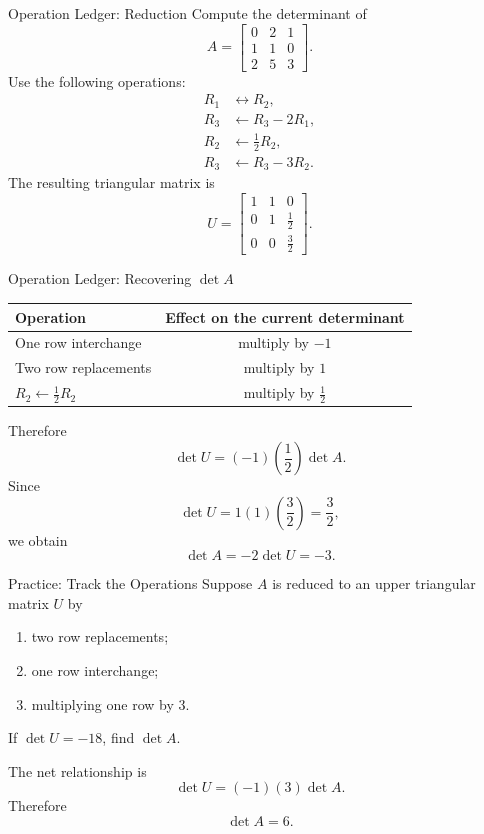 \begin{frame}{Operation Ledger: Reduction}
\small
Compute the determinant of
\[
A=\begin{bmatrix}
0&2&1\\
1&1&0\\
2&5&3
\end{bmatrix}.
\]
Use the following operations:
\[
\begin{aligned}
R_1&\leftrightarrow R_2,\\
R_3&\leftarrow R_3-2R_1,\\
R_2&\leftarrow \tfrac12 R_2,\\
R_3&\leftarrow R_3-3R_2.
\end{aligned}
\]
\pause
The resulting triangular matrix is
\[
U=\begin{bmatrix}
1&1&0\\
0&1&\tfrac12\\
0&0&\tfrac32
\end{bmatrix}.
\]
\end{frame}

\begin{frame}{Operation Ledger: Recovering $\det A$}
\small
\renewcommand{\arraystretch}{1.35}
\begin{center}
\begin{tabular}{lc}
\toprule
Operation & Effect on the current determinant \\
\midrule
One row interchange & multiply by $-1$ \\
Two row replacements & multiply by $1$ \\
$R_2\leftarrow\tfrac12R_2$ & multiply by $\tfrac12$ \\
\bottomrule
\end{tabular}
\end{center}
Therefore
\[
\det U=(-1)\left(\frac12\right)\det A.
\]
\pause
Since
\[
\det U=1(1)\left(\frac32\right)=\frac32,
\]
we obtain
\[
\boxed{\det A=-2\det U=-3}.
\]
\end{frame}

\begin{frame}{Practice: Track the Operations}
Suppose $A$ is reduced to an upper triangular matrix $U$ by
\begin{enumerate}
  \item two row replacements;
  \item one row interchange;
  \item multiplying one row by $3$.
\end{enumerate}
If $\det U=-18$, find $\det A$.
\pause

The net relationship is
\[
\det U=(-1)(3)\det A.
\]
Therefore
\[
\boxed{\det A=6}.
\]
\end{frame}

